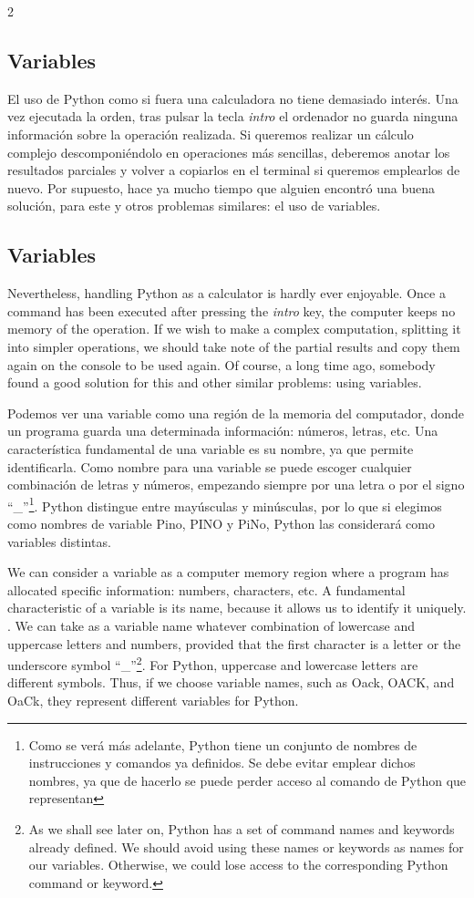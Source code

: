 \begin{paracol}{2}
\subsection{Variables}
El uso de Python como si fuera una calculadora no tiene demasiado interés. Una vez ejecutada la orden, tras pulsar la tecla \emph{intro} el ordenador no guarda ninguna información sobre la operación realizada. Si queremos realizar un cálculo complejo descomponiéndolo en operaciones más sencillas, deberemos anotar los resultados parciales y volver a copiarlos en el terminal si queremos emplearlos de nuevo. Por supuesto, hace ya mucho tiempo que alguien encontró una buena solución, para este y otros problemas similares: el uso de variables.

\switchcolumn
\subsection{Variables}
Nevertheless, handling Python as a calculator is hardly ever enjoyable. Once a command has been executed after pressing the \emph{intro} key, the computer keeps no memory of the operation. If we wish to make a complex computation, splitting it into simpler operations, we should take note of the partial results and copy them again on the console to be used again. Of course, a long time ago, somebody found a good solution for this and other similar problems: using variables.

\switchcolumn
Podemos ver una variable como una región de la memoria del computador, donde un programa guarda una determinada información: números, letras, etc. Una característica fundamental de una variable es su nombre, ya que permite identificarla.  Como nombre para una variable se puede escoger cualquier combinación de letras y números, empezando siempre por una letra o por el signo ``\_''\footnote{Como se verá más adelante, Python tiene un conjunto de nombres de instrucciones y comandos ya definidos. Se debe evitar emplear dichos nombres, ya que de hacerlo se puede perder acceso al comando de Python que representan}. Python distingue entre mayúsculas y minúsculas, por lo que si elegimos como nombres de variable Pino, PINO y PiNo, Python las considerará como variables distintas. 

\switchcolumn
We can consider a variable as a computer memory region where a program has allocated specific information: numbers, characters, etc. A fundamental characteristic of a variable is its name, because it allows us to identify it uniquely. . We can take as a variable name whatever combination of lowercase and uppercase letters and numbers, provided that the first character is a letter or the underscore symbol ``\_''\footnote{As we shall see later on, Python has a set of command names and keywords already defined. We should avoid using these names or keywords as names for our variables. Otherwise, we could lose access to the corresponding Python command or keyword.}. For Python, uppercase and lowercase letters are different symbols. Thus, if we choose variable names, such as Oack, OACK, and OaCk, they represent different variables for Python.


\end{paracol}
